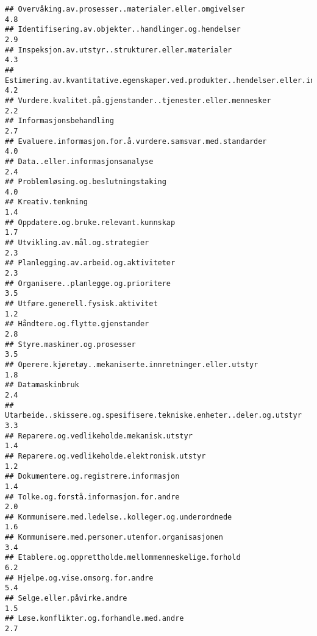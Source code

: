 \documentclass[
]{article}
\begin{document}
\begin{verbatim}
## Overvåking.av.prosesser..materialer.eller.omgivelser                             4.8
## Identifisering.av.objekter..handlinger.og.hendelser                              2.9
## Inspeksjon.av.utstyr..strukturer.eller.materialer                                4.3
## Estimering.av.kvantitative.egenskaper.ved.produkter..hendelser.eller.informasjon 4.2
## Vurdere.kvalitet.på.gjenstander..tjenester.eller.mennesker                       2.2
## Informasjonsbehandling                                                           2.7
## Evaluere.informasjon.for.å.vurdere.samsvar.med.standarder                        4.0
## Data..eller.informasjonsanalyse                                                  2.4
## Problemløsing.og.beslutningstaking                                               4.0
## Kreativ.tenkning                                                                 1.4
## Oppdatere.og.bruke.relevant.kunnskap                                             1.7
## Utvikling.av.mål.og.strategier                                                   2.3
## Planlegging.av.arbeid.og.aktiviteter                                             2.3
## Organisere..planlegge.og.prioritere                                              3.5
## Utføre.generell.fysisk.aktivitet                                                 1.2
## Håndtere.og.flytte.gjenstander                                                   2.8
## Styre.maskiner.og.prosesser                                                      3.5
## Operere.kjøretøy..mekaniserte.innretninger.eller.utstyr                          1.8
## Datamaskinbruk                                                                   2.4
## Utarbeide..skissere.og.spesifisere.tekniske.enheter..deler.og.utstyr             3.3
## Reparere.og.vedlikeholde.mekanisk.utstyr                                         1.4
## Reparere.og.vedlikeholde.elektronisk.utstyr                                      1.2
## Dokumentere.og.registrere.informasjon                                            1.4
## Tolke.og.forstå.informasjon.for.andre                                            2.0
## Kommunisere.med.ledelse..kolleger.og.underordnede                                1.6
## Kommunisere.med.personer.utenfor.organisasjonen                                  3.4
## Etablere.og.opprettholde.mellommenneskelige.forhold                              6.2
## Hjelpe.og.vise.omsorg.for.andre                                                  5.4
## Selge.eller.påvirke.andre                                                        1.5
## Løse.konflikter.og.forhandle.med.andre                                           2.7

\end{verbatim}
\end{document}
